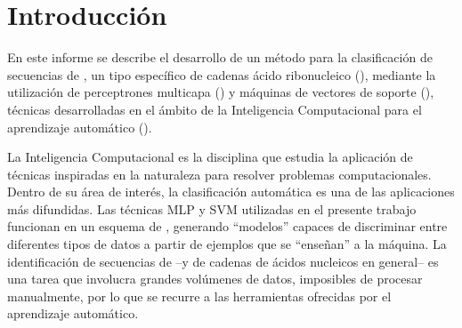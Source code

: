 %
%
%
\chapter{Introducción}
\setcounter{page}{1}
%
En este informe se describe el desarrollo de un método para la
clasificación de secuencias de \premirna{}, un tipo específico de
cadenas ácido ribonucleico (), mediante la utilización de
perceptrones multicapa () y máquinas de vectores de soporte
(), técnicas desarrolladas en el ámbito de la Inteligencia
Computacional para el aprendizaje automático ().

La Inteligencia Computacional es la disciplina que estudia la
aplicación de técnicas inspiradas en la naturaleza para resolver
problemas computacionales.
Dentro de su área de interés, la clasificación automática es una de
las aplicaciones más difundidas.
Las técnicas MLP y SVM utilizadas en el presente trabajo funcionan en
un esquema de , generando ``modelos''
capaces de discriminar entre diferentes tipos de datos a partir de
ejemplos que se ``enseñan'' a la máquina.
La identificación de secuencias de  --y de cadenas de
ácidos nucleicos en general-- es una tarea que involucra grandes
volúmenes de datos, imposibles de procesar manualmente, por lo que se
recurre a las herramientas ofrecidas por el aprendizaje automático.
